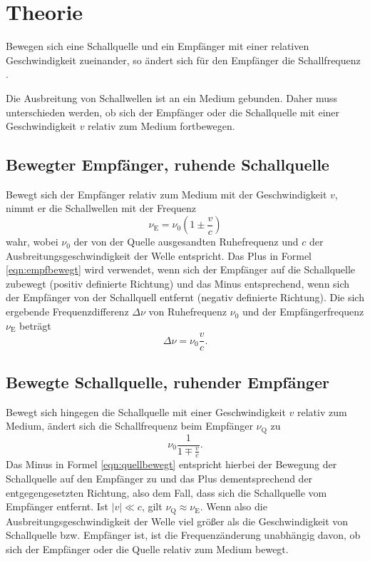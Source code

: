 \section{Theorie}
\label{sec:Theorie}

Bewegen sich eine Schallquelle und ein Empfänger mit einer relativen Geschwindigkeit 
zueinander, so ändert sich für den Empfänger die Schallfrequenz \cite{demtröder}.

Die Ausbreitung von Schallwellen ist an ein Medium gebunden.
Daher muss unterschieden werden, ob sich der Empfänger oder die Schallquelle mit einer 
Geschwindigkeit $v$ relativ zum Medium fortbewegen.

\subsection{Bewegter Empfänger, ruhende Schallquelle}
Bewegt sich der Empfänger relativ zum Medium mit der Geschwindigkeit $v$, nimmt er die
Schallwellen mit der Frequenz
\begin{equation}
	\label{eqn:empfbewegt}
	\nu_{\mathrm{E}} = \nu_0 ( 1 \pm \frac{v}{c} )
\end{equation}
wahr, wobei $\nu_0$ der von der Quelle ausgesandten Ruhefrequenz und $c$ der
Ausbreitungsgeschwindigkeit der Welle entspricht.
Das Plus in Formel \eqref{eqn:empfbewegt} wird verwendet, wenn sich der Empfänger auf die 
Schallquelle zubewegt (positiv definierte Richtung) und das Minus entsprechend, 
wenn sich der Empfänger von der Schallquell entfernt (negativ definierte Richtung).
Die sich ergebende Frequenzdifferenz $\Delta \nu$ von Ruhefrequenz $\nu_0$ und der
Empfängerfrequenz $\nu_{\mathrm{E}}$ beträgt
\begin{equation*}
	\Delta \nu = \nu_0 \frac{v}{c} \mathrm{.}
\end{equation*}

\subsection{Bewegte Schallquelle, ruhender Empfänger}
Bewegt sich hingegen die Schallquelle mit einer Geschwindigkeit $v$ relativ zum Medium,
ändert sich die Schallfrequenz beim Empfänger $\nu_{\mathrm{Q}}$ zu 
\begin{equation}
	\label{eqn:quellbewegt}
	\nu_0 \frac{1}{1 \mp \frac{v}{c}} \mathrm{.}
\end{equation}
Das Minus in Formel \eqref{eqn:quellbewegt} entspricht hierbei der Bewegung der Schallquelle 
auf den Empfänger zu und das Plus dementsprechend der entgegengesetzten Richtung, also dem 
Fall, dass sich die Schallquelle vom Empfänger entfernt.
Ist $|v| \ll c$, gilt $\nu_{\mathrm{Q}} \approx \nu_{\mathrm{E}}$. Wenn also die 
Ausbreitungsgeschwindigkeit der Welle viel größer als die Geschwindigkeit von Schallquelle bzw. 
Empfänger ist, ist die Frequenzänderung unabhängig davon, ob sich der Empfänger oder die 
Quelle relativ zum Medium bewegt.
